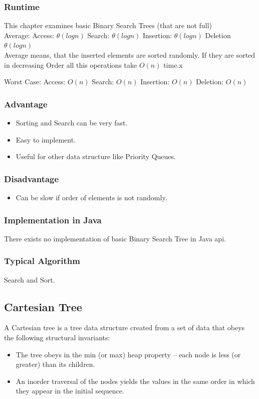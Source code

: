 \documentclass[12pt,a4paper]{article}
\newcommand{\RuntimeHead}{Runtime}
\newcommand{\AdvantageHead}{Advantage}
\newcommand{\DisadvantageHead}{Disadvantage}
\newcommand{\ImplementationInJavaHead}{Implementation in Java}
\newcommand{\TypicalAlgorithmHead}{Typical Algorithm}
\begin{document}
\subsubsection{\RuntimeHead}
This chapter examines basic Binary Search Trees (that are not full)\\
Average: 
Access: $\theta(log n)  $
Search: $\theta(log n)  $
Insertion: $\theta(log n)  $
Deletion $\theta(log n)  $\\
Average means, that the inserted elements are sorted randomly. If they are sorted in decreasing Order all this operations take $O(n)$ time.x

Worst Case: 
Access:  $O(n)$ 
Search: $O(n) $
Insertion: $O(n)$ 
Deletion: $O(n)$ 
\subsubsection{\AdvantageHead}
\begin{itemize}
\item Sorting and Search can be very fast.
\item Easy to implement.
\item Useful for other data structure like Priority Queues.
\end{itemize}
\subsubsection{\DisadvantageHead}
\begin{itemize}
\item Can be slow if order of elements is not randomly.
\end{itemize}
\subsubsection{\ImplementationInJavaHead}
There exists no implementation of basic Binary Search Tree in Java api.
\subsubsection{\TypicalAlgorithmHead}
Search and Sort.

\subsection{Cartesian Tree}
A Cartesian tree is a tree data structure created from a set of data that obeys the  following structural invariants:
\begin{itemize}
\item The tree obeys in the min (or max) heap property – each node is less (or greater) than its children.
\item An inorder traversal of the nodes yields the values in the same order in which they appear in the initial sequence.
\end{itemize}
\end{document}
